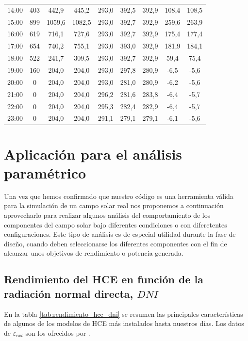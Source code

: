 \begin{table}[]
{\begin{tabular}{ccccccccc}
14:00 & 403 & 442,9  & 445,2  & 293,0 & 392,5 & 392,9 & 108,4 & 108,5 \\
15:00 & 899 & 1059,6 & 1082,5 & 293,0 & 392,7 & 392,9 & 259,6 & 263,9 \\
16:00 & 619 & 716,1  & 727,6  & 293,0 & 392,7 & 392,9 & 175,4 & 177,4 \\
17:00 & 654 & 740,2  & 755,1  & 293,0 & 393,0 & 392,9 & 181,9 & 184,1 \\
18:00 & 522 & 241,7  & 309,5  & 293,0 & 392,7 & 392,9 & 59,4  & 75,4  \\
19:00 & 160 & 204,0  & 204,0  & 293,0 & 297,8 & 280,9 & -6,5  & -5,6  \\
20:00 & 0   & 204,0  & 204,0  & 293,0 & 281,0 & 280,9 & -6,2  & -5,6  \\
21:00 & 0   & 204,0  & 204,0  & 296,2 & 281,6 & 283,8 & -6,4  & -5,7  \\
22:00 & 0   & 204,0  & 204,0  & 295,3 & 282,4 & 282,9 & -6,4  & -5,7  \\
23:00 & 0   & 204,0  & 204,0  & 291,1 & 279,1 & 279,1 & -6,1  & -5,6 
\end{tabular}%
}
\end{table}


\section{Aplicación para el análisis paramétrico}
\label{analisis-parametrico}

Una vez que hemos confirmado que nuestro código es una herramienta válida para la simulación de un campo solar real nos proponemos a continuación aprovecharlo para realizar algunos análisis del comportamiento de los componentes del campo solar bajo diferentes condiciones o con diferetentes configuraciones. Este tipo de análisis es de especial utilidad durante la fase de diseño, cuando deben seleccionarse los diferentes componentes con el fin de alcanzar unos objetivos de rendimiento o potencia generada.

\subsection{Rendimiento del HCE en función de la radiación normal directa, $DNI$}

En la tabla \ref{tab:rendimiento_hce_dni} se resumen las principales características de algunos de los modelos de HCE más instalados hasta nuestros días. Los datos de $\varepsilon_{ext}$ son los ofrecidos por \cite{barberofresnoDesarrolloModeloTeorico2018}.

